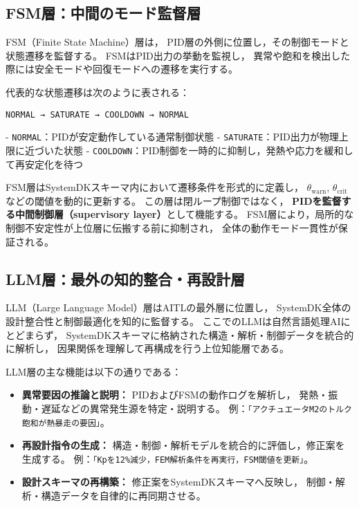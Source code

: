 \subsection{FSM層：中間のモード監督層}
FSM（Finite State Machine）層は，
PID層の外側に位置し，その制御モードと状態遷移を監督する。
FSMはPID出力の挙動を監視し，
異常や飽和を検出した際には安全モードや回復モードへの遷移を実行する。

代表的な状態遷移は次のように表される：

\begin{center}
\texttt{NORMAL → SATURATE → COOLDOWN → NORMAL}
\end{center}

- \texttt{NORMAL}：PIDが安定動作している通常制御状態  
- \texttt{SATURATE}：PID出力が物理上限に近づいた状態  
- \texttt{COOLDOWN}：PID制御を一時的に抑制し，発熱や応力を緩和して再安定化を待つ  

FSM層はSystemDKスキーマ内において遷移条件を形式的に定義し，
$\theta_{\mathrm{warn}}$, $\theta_{\mathrm{crit}}$ などの閾値を動的に更新する。
この層は閉ループ制御ではなく，
\textbf{PIDを監督する中間制御層（supervisory layer）}として機能する。
FSM層により，局所的な制御不安定性が上位層に伝搬する前に抑制され，
全体の動作モード一貫性が保証される。

\subsection{LLM層：最外の知的整合・再設計層}
LLM（Large Language Model）層はAITLの最外層に位置し，
SystemDK全体の設計整合性と制御最適化を知的に監督する。
ここでのLLMは自然言語処理AIにとどまらず，
SystemDKスキーマに格納された構造・解析・制御データを統合的に解析し，
因果関係を理解して再構成を行う上位知能層である。

LLM層の主な機能は以下の通りである：

\begin{itemize}
  \item \textbf{異常要因の推論と説明：}  
  PIDおよびFSMの動作ログを解析し，
  発熱・振動・遅延などの異常発生源を特定・説明する。  
  例：\texttt{「アクチュエータM2のトルク飽和が熱暴走の要因」}。

  \item \textbf{再設計指令の生成：}  
  構造・制御・解析モデルを統合的に評価し，修正案を生成する。  
  例：\texttt{「Kpを12\%減少，FEM解析条件を再実行，FSM閾値を更新」}。

  \item \textbf{設計スキーマの再構築：}  
  修正案をSystemDKスキーマへ反映し，
  制御・解析・構造データを自律的に再同期させる。
\end{itemize}

